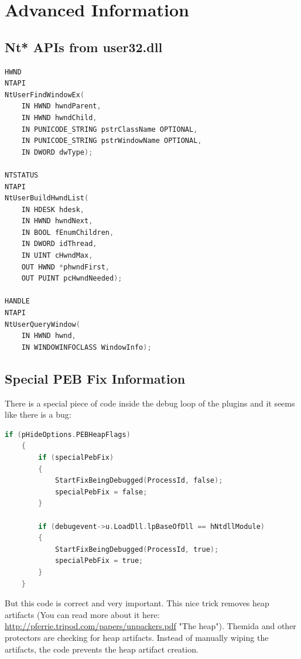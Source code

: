 \documentclass[10pt,a4paper]{article}
\begin{document}
\pagebreak

\section{Advanced Information}
\subsection{Nt* APIs from user32.dll}

\begin{lstlisting}[language=C, caption=Special Nt* APIs declaration]
HWND
NTAPI
NtUserFindWindowEx(
    IN HWND hwndParent,
    IN HWND hwndChild,
    IN PUNICODE_STRING pstrClassName OPTIONAL,
    IN PUNICODE_STRING pstrWindowName OPTIONAL,
    IN DWORD dwType);

NTSTATUS
NTAPI
NtUserBuildHwndList(
    IN HDESK hdesk,
    IN HWND hwndNext,
    IN BOOL fEnumChildren,
    IN DWORD idThread,
    IN UINT cHwndMax,
    OUT HWND *phwndFirst,
    OUT PUINT pcHwndNeeded);

HANDLE
NTAPI
NtUserQueryWindow(
    IN HWND hwnd,
    IN WINDOWINFOCLASS WindowInfo);
\end{lstlisting}

\subsection{Special PEB Fix Information}

There is a special piece of code inside the debug loop of the plugins and it seems like there is a bug:
\begin{lstlisting}[language=C, caption=Special PEB Fix Code]
    if (pHideOptions.PEBHeapFlags)
    {
        if (specialPebFix)
        {
            StartFixBeingDebugged(ProcessId, false);
            specialPebFix = false;
        }

        if (debugevent->u.LoadDll.lpBaseOfDll == hNtdllModule)
        {
            StartFixBeingDebugged(ProcessId, true);
            specialPebFix = true;
        }
    }
\end{lstlisting}
But this code is correct and very important. This nice trick removes heap artifacts (You can read more about it here: \url{http://pferrie.tripod.com/papers/unpackers.pdf} "The heap"). Themida and other protectors are checking for heap artifacts. Instead of manually wiping the artifacts, the code prevents the heap artifact creation.
\end{document}
